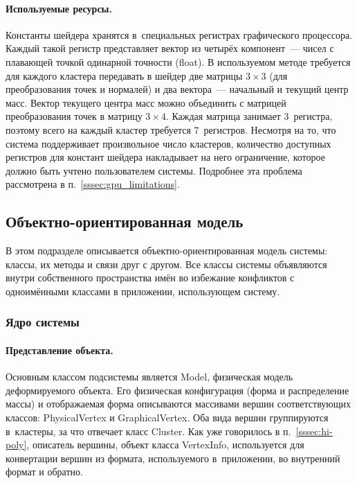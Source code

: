 \documentclass[a4paper, 14pt, titlepage]{extarticle}
\begin{document}
        \paragraph{Используемые ресурсы.}
        Константы шейдера хранятся в~специальных регистрах графического процессора. Каждый такой регистр
        представляет вектор из четырёх компонент~--- чисел с плавающей точкой одинарной точности
        (float). В используемом методе требуется для каждого
        кластера передавать в шейдер две матрицы $3 \times 3$ (для преобразования точек и нормалей) и два
        вектора~--- начальный и текущий центр масс. Вектор текущего центра масс можно объединить с
        матрицей преобразования точек в матрицу $3 \times 4$. Каждая матрица занимает 3~регистра,
        поэтому всего на каждый кластер требуется 7~регистров. Несмотря на то, что система
        поддерживает произвольное число кластеров, количество доступных регистров для констант
        шейдера накладывает на него ограничение, которое должно быть учтено пользователем системы.
        Подробнее эта проблема рассмотрена в п.~\ref{sssec:gpu_limitations}.

    \subsection{Объектно-ориентированная модель}

      В этом подразделе описывается объектно-ориентированная модель системы: классы, их методы и
      связи друг с другом. Все классы системы объявляются внутри собственного пространства имён во
      избежание конфликтов с одноимёнными классами в приложении, использующем систему.

      \subsubsection{Ядро системы}

        \paragraph{Представление объекта.}
        Основным классом подсистемы является Model, физическая модель деформируемого объекта.
        Его физическая конфигурация (форма и распределение массы) и отображаемая форма описываются
        массивами вершин соответствующих классов: PhysicalVertex и GraphicalVertex. Оба вида вершин
        группируются в~кластеры, за что отвечает класс Cluster. Как уже говорилось в
        п.~\ref{sssec:hi-poly}, описатель вершины, объект класса VertexInfo, используется для
        конвертации вершин из формата, используемого в~приложении, во внутренний формат и обратно.
\end{document}
